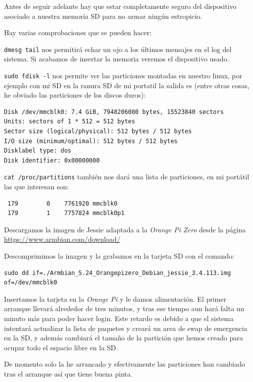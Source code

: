 \documentclass[12pt,spanish,]{scrartcl}
\begin{document}
Antes de seguir adelante hay que estar completamente seguro del
dispositivo asociado a nuestra memoria SD para no armar ningún
estropicio.

Hay varias comprobaciones que se pueden hacer:

\texttt{dmesg\ \textbar{}tail} nos permitirá echar un ojo a los últimos
mensajes en el log del sistema. Si acabamos de insertar la memoria
veremos el dispositivo usado.

\texttt{sudo\ fdisk\ -l} nos permite ver las particiones montadas en
nuestro linux, por ejemplo con mi SD en la ranura SD de mi portatil la
salida es (entre otras cosas, he obviado las particiones de los discos
duros):

\begin{verbatim}
Disk /dev/mmcblk0: 7.4 GiB, 7948206080 bytes, 15523840 sectors
Units: sectors of 1 * 512 = 512 bytes
Sector size (logical/physical): 512 bytes / 512 bytes
I/O size (minimum/optimal): 512 bytes / 512 bytes
Disklabel type: dos
Disk identifier: 0x00000000
\end{verbatim}

\texttt{cat\ /proc/partitions} también nos dará una lista de
particiones, en mi portátil las que interesan son:

\begin{verbatim}
 179        0    7761920 mmcblk0
 179        1    7757824 mmcblk0p1
\end{verbatim}

Descargamos la imagen de Jessie adaptada a la \emph{Orange Pi Zero}
desde la página \url{https://www.armbian.com/download/}

Descomprimimos la imagen y la grabamos en la tarjeta SD con el comando:

\begin{verbatim}
sudo dd if=./Armbian_5.24_Orangepizero_Debian_jessie_3.4.113.img of=/dev/mmcblk0
\end{verbatim}

Insertamos la tarjeta en la \emph{Orange Pi} y le damos alimentación. El
primer arranque llevará alrededor de tres minutos, y tras ese tiempo aun
hará falta un minuto más para poder hacer login. Este retardo es debido
a que el sistema intentará actualizar la lista de paquetes y creará un
area de swap de emergencia en la SD, y además cambiará el tamaño de la
partición que hemos creado para ocupar todo el espacio libre en la SD.

De momento solo la he arrancado y efectivamente las particiones han
cambiado tras el arranque así que tiene buena pinta.
\end{document}
